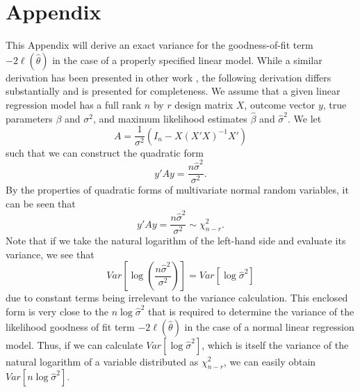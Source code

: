 \documentclass[submit]{smj}
\begin{document}


\appendix
\section*{Appendix}
This Appendix will derive an exact variance for the goodness-of-fit term $-2 \ell (\hat{\theta} )$ in the case of a properly specified
linear model. While a similar derivation has been presented in other work \citet{McQuarrie}, the following derivation differs substantially and is presented for completeness.
We assume that a given linear regression model has a full rank $n$ by $r$ design matrix $X$, outcome vector $y$, true parameters $\beta$ and $\sigma^2$,
and maximum likelihood estimates $\hat{\beta}$ and $\hat{\sigma}^2$. We let
\begin{equation*}
	A = \frac{1}{\sigma^2} (I_n - X(X'X)^{-1}X') 
\end{equation*}
such that we can construct the quadratic form
\begin{equation*}
	y'Ay = \frac{n \hat{\sigma}^2}{\sigma^2} .
\end{equation*}
By the properties of quadratic forms of multivariate normal random variables, it can be seen that
\begin{equation}
	y'Ay = \frac{n \hat{\sigma}^2}{\sigma^2} \sim \chi^2_{n-r} .
\end{equation}
Note that if we take the natural logarithm of the left-hand side and evaluate its variance, we see that
\begin{equation}
	Var \left[ \log(\frac{n \hat{\sigma}^2}{\sigma^2}) \right]  = Var \left[ \log \hat{\sigma}^2 \right]
\end{equation}
due to constant terms being irrelevant to the variance calculation. This enclosed form is very close to the $n \log \hat{\sigma}^2$ that is required
to determine the variance of the likelihood goodness of fit term $-2 \ell (\hat{\theta} )$ in the case of a normal linear regression model.
Thus, if we can calculate $Var \left[ \log \hat{\sigma}^2 \right]$, which is itself the variance
of the natural logarithm of a variable distributed as $\chi^2_{n-r}$, we can easily obtain $Var \left[ n \log \hat{\sigma}^2 \right]$.
\end{document}
